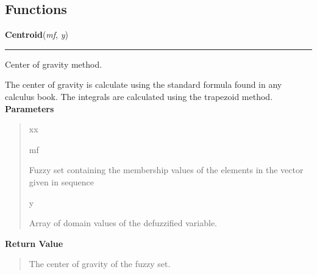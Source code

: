   \subsection{Functions}

    \label{peach:fuzzy:defuzzy:Centroid}

    \vspace{0.5ex}

\hspace{.8\funcindent}\begin{boxedminipage}{\funcwidth}

    \raggedright \textbf{Centroid}(\textit{mf}, \textit{y})

    \vspace{-1.5ex}

    \rule{\textwidth}{0.5\fboxrule}
\setlength{\parskip}{2ex}

Center of gravity method.

The center of gravity is calculate using the standard formula found in any
calculus book. The integrals are calculated using the trapezoid method.
\setlength{\parskip}{1ex}
      \textbf{Parameters}
      \vspace{-1ex}

      \begin{quote}
        \begin{Ventry}{xx}

          \item[mf]


Fuzzy set containing the membership values of the elements in the
vector given in sequence
          \item[y]


Array of domain values of the defuzzified variable.
        \end{Ventry}

      \end{quote}

      \textbf{Return Value}
    \vspace{-1ex}

      \begin{quote}

The center of gravity of the fuzzy set.
      \end{quote}

    \end{boxedminipage}

    \label{peach:fuzzy:defuzzy:Bisector}

